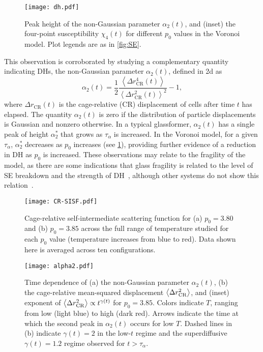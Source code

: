 \documentclass[amsmath,amssymb,prl,reprint,twocolumn]{revtex4-2}
\begin{document}
\begin{figure}
\centering
\texttt{[image: dh.pdf]}
\vspace{-1.\intextsep}
\caption{
Peak height of the non-Gaussian parameter $\alpha_2(t)$, and (inset) the four-point susceptibility $\chi_4(t)$ for different $p_0$ values in the Voronoi model. 
Plot legends are as in \cref{fig:SE}.
}
\label{fig:dh}
\end{figure}



This observation is corroborated by studying a complementary quantity indicating DHs, the non-Gaussian parameter $\alpha_2(t)$, defined in 2d as~\cite{Rahman1964, Huang2015}
\begin{equation}
\alpha_2(t) = \frac{1}{2}\frac{\left<\Delta r_{\text{CR}}^4(t)\right>}{\left<\Delta r_{\text{CR}}^2(t)\right>^2}-1,
\label{eq:alpha2}
\end{equation}
where $\Delta r_{\text{CR}}(t)$ is the cage-relative (CR) displacement of cells after time $t$ has elapsed.
The quantity $\alpha_2(t)$ is zero if the distribution of particle displacements is Gaussian and nonzero otherwise.
In a typical glassformer, $\alpha_2(t)$ has a single peak of height $\alpha_2^*$ that grows as $\tau_{\alpha}$ is increased.
In the Voronoi model, for a given $\tau_{\alpha}$, $\alpha_2^*$ decreases as $p_0$ increases (see \cref{fig:dh}), providing further evidence of a reduction in DH as $p_0$ is increased.
These observations may relate to the fragility of the model, as there are some indications that glass fragility is related to the level of SE breakdown and the strength of DH~\cite{Bouhadja2014,Ozawa2016}, although other systems do not show this relation~\cite{Chen2006,Jung2004,Nandi2021,Sengupta2013,Nandi2021,Dyre2007}.


\begin{figure}[t]
\centering
\texttt{[image: CR-SISF.pdf]}
\vspace{-1\intextsep}
\caption{Cage-relative self-intermediate scattering function for (a) $p_0=3.80$ and (b) $p_0=3.85$ across the full range of temperature studied for each $p_0$ value (temperature increases from blue to red).
Data shown here is averaged across ten configurations.
}
\label{fig:CRSISF}
\end{figure}

\begin{figure}
\centering
\texttt{[image: alpha2.pdf]}
\vspace{-1.5\intextsep}
\caption{
Time dependence of (a) the non-Gaussian parameter $\alpha_2(t)$, (b) the cage-relative mean-squared displacement $\expval{\Delta r^2_{\text{CR}}}$, and (inset) exponent of $\expval{\Delta r^2_{\text{CR}}}\propto t^{\gamma(t)}$ for $p_0=3.85$.
Colors indicate $T$, ranging from low (light blue) to high (dark red).
Arrows indicate the time at which the second peak in $\alpha_2(t)$ occurs for low $T$.
Dashed lines in (b) indicate $\gamma(t)=2$ in the low-$t$ regime and the superdiffusive $\gamma(t)=1.2$ regime observed for $t>\tau_{\alpha}$.
}
\label{fig:alpha2}
\end{figure}
\end{document}

